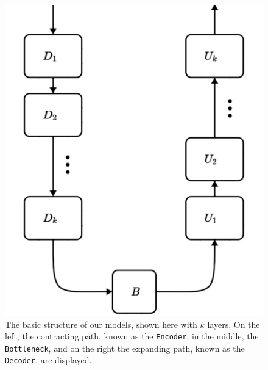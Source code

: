 \documentclass[11pt]{article}
\begin{document}
\begin{multicols}{2}
      \begin{figure}[H]
            \centering
            \includegraphics[width=0.7\linewidth]{model-structure.png}
            \caption{The basic structure of our models, shown here with $k$ layers. On the left, the contracting path, known as the \texttt{Encoder}, in the middle, the \texttt{Bottleneck}, and on the right the expanding path, known as the \texttt{Decoder}, are displayed.}
            \label{fig:model_structure}
      \end{figure}


\end{multicols}
\end{document}
